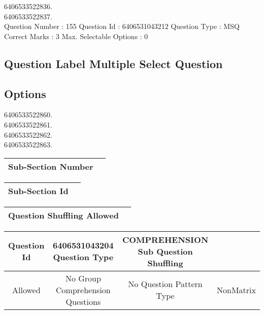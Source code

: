 \documentclass{article}
\begin{document}
6406533522836.\\

6406533522837.\\

Question Number : 155 Question Id : 6406531043212 Question Type : MSQ\\

Correct Marks : 3 Max. Selectable Options : 0\\

\subsection{Question Label  Multiple Select Question}

\subsection{Options }

6406533522860.\\

6406533522861.\\

6406533522862.\\

6406533522863.\\

\begin{longtable}{|c|c|}
\hline
\textbf{Sub-Section Number} & \textbf{} \\ \hline
\end{longtable}

\begin{longtable}{|c|c|}
\hline
\textbf{Sub-Section Id} & \textbf{} \\ \hline
\end{longtable}

\begin{longtable}{|c|c|}
\hline
\textbf{Question Shuffling Allowed} & \textbf{} \\ \hline
\end{longtable}

\begin{longtable}{|c|c|c|c|}
\hline
\textbf{Question Id} & \textbf{6406531043204 Question Type} & \textbf{COMPREHENSION Sub Question Shuffling} & \textbf{} \\ \hline
Allowed & No Group Comprehension Questions & No Question Pattern Type & NonMatrix \\ \hline
\end{longtable}
\end{document}
